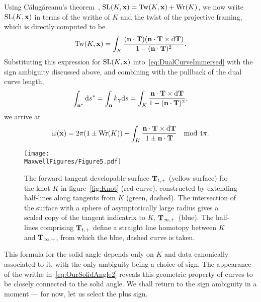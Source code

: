     Using C\u{a}lug\u{a}reanu's theorem~\citep{Calugareanu1959,Calugareanu1961}, $ \mathrm{SL}(K,{\bf x}) = \mathrm{Tw}(K,{\bf x}) +\mathrm{Wr}(K)$, we now write $ \mathrm{SL}(K,{\bf x})$ in terms of the writhe of $K$ and the twist of the projective framing, which is directly computed to be 
    \begin{equation}
        \mathrm{Tw}(K,{\bf x}) = \int_K  \frac{ ( {\bf n} \cdot {\bf T} ) ({\bf n} \cdot {\bf T} \times \mathrm{d}{\bf T}) }{1 - ({\bf n} \cdot {\bf T})^2} . 
        \label{eq:Twist}
    \end{equation}
    Substituting this expression for $\mathrm{SL}(K,{\bf x})$ into~\eqref{eq:DualCurveImmersed} with the sign ambiguity discussed above, and combining with the pullback of the dual curve length,
    \begin{equation}
        \int_{{\bf n ^*}} \mathrm{d} s^* = \int_{{\bf n}} k_{\bf \boldsymbol \gamma } \mathrm{d} s = \int_K  \frac{ {\bf n} \cdot {\bf T} \times \mathrm{d}{\bf T} }{1 - ({\bf n} \cdot {\bf T})^2},
        \label{eq:geodesicpullback1}
    \end{equation}
    we arrive at
    \begin{equation}
        \omega({\bf x}) = 2 \pi(1 \pm \mathrm{Wr}(K)) - \int_K  \frac{ {\bf n} \cdot {\bf T} \times \mathrm{d}{\bf T} }{1 \pm {\bf n} \cdot {\bf T}}  \quad \mathrm{mod}\; 4\pi .
        \label{eq:OurSolidAngle2}
    \end{equation}    
    \begin{figure}[t]
        \begin{centering}
            \texttt{[image: \\MaxwellFigures/Figure5.pdf]}
            \caption[Homotopy along the tangent developable surface.]{The forward tangent developable surface ${\bf{T}}_{t,+}$ (yellow surface) for the knot $K$ in figure~\ref{fig:Knot} (red curve), constructed by extending half-lines along tangents from $K$ (green, dashed). The intersection of the surface with a sphere of asymptotically large radius gives a scaled copy of the tangent indicatrix to $K$, ${\bf T}_{\infty,+}$ (blue). The half-lines comprising ${\bf T}_{t,+}$ define a straight line homotopy between $K$ and ${\bf T}_{\infty,+}$, from which the blue, dashed curve is taken.}
            \label{fig:TangentDevelopable}
        \end{centering}
    \end{figure}
    This formula for the solid angle depends only on $K$ and data canonically associated to it, with the only ambiguity being a choice of sign. The appearance of the writhe in~\eqref{eq:OurSolidAngle2} reveals this geometric property of curves to be closely connected to the solid angle. We shall return to the sign ambiguity in a moment --- for now, let us select the plus sign. 

